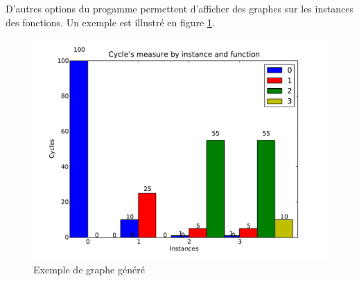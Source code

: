 D'autres options du progamme permettent d'afficher des graphes sur les instances des fonctions. Un exemple est illustré en figure \ref{fig:instance_plot}.\\

\begin{figure}[here]
  \centering
  \includegraphics[scale=0.50]{images/instance_plot}
  \caption{Exemple de graphe généré}
  \label{fig:instance_plot}
\end{figure}


